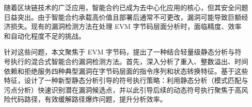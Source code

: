 \documentclass[print, master, vlined, timesmath]{DissertUESTC}
\begin{document}
		{}
		{}
		{}
		{}
		{}
		{} 





\zhabstract
随着区块链技术的广泛应用，智能合约已成为去中心化应用的核心，但其安全问题日益突出。由于智能合约承载高价值且部署后通常不可更改，漏洞可能导致巨额经济损失。现有的漏洞检测方法在处理 EVM 字节码层面分析时，面临精度、效率和自动化程度不足的挑战。

针对这些问题，本文聚焦于 EVM 字节码，提出了一种结合轻量级静态分析与符号执行的混合式智能合约漏洞检测方法。首先，深入分析了重入、整数溢出、时间依赖和拒绝服务四种典型漏洞在字节码层面的指令序列和状态转换特征。基于这些特征，设计了一种新型静态分析引导的符号执行策略：利用静态分析（模式匹配与污点分析）快速识别潜在漏洞候选点，并以此引导后续的动态符号执行聚焦于高风险代码路径，有效缓解路径爆炸问题，提升分析效率。
\end{document}
